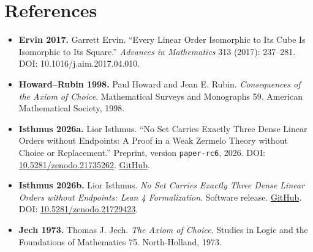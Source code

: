 \documentclass[
  english,
  11pt,
  reqno]{amsart}
\providecommand{\tightlist}{%
  \setlength{\itemsep}{0pt}\setlength{\parskip}{0pt}}
\begin{document}
\section{References}\label{references}

\protect{}\label{ref:ervin2017}

\begin{itemize}
\tightlist
\item
  \textbf{Ervin 2017.} Garrett Ervin. ``Every Linear Order Isomorphic to
  Its Cube Is Isomorphic to Its Square.'' \emph{Advances in Mathematics}
  313 (2017): 237--281. DOI: 10.1016/j.aim.2017.04.010.
\end{itemize}

\protect{}\label{ref:howardrubin1998}

\begin{itemize}
\tightlist
\item
  \textbf{Howard--Rubin 1998.} Paul Howard and Jean E. Rubin.
  \emph{Consequences of the Axiom of Choice}. Mathematical Surveys and
  Monographs 59. American Mathematical Society, 1998.
\end{itemize}

\protect{}\label{ref:isthmus2026a}

\begin{itemize}
\tightlist
\item
  \textbf{Isthmus 2026a.} Lior Isthmus. ``No Set Carries Exactly Three
  Dense Linear Orders without Endpoints: A Proof in a Weak Zermelo
  Theory without Choice or Replacement.'' Preprint, version
  \texttt{paper-rc6}, 2026. DOI:
  \href{https://doi.org/10.5281/zenodo.21735262}{10.5281/zenodo.21735262}.
  \href{https://github.com/lioristhmus/no-exactly-three-dlo}{GitHub}.
\end{itemize}

\protect{}\label{ref:isthmus2026b}

\begin{itemize}
\tightlist
\item
  \textbf{Isthmus 2026b.} Lior Isthmus. \emph{No Set Carries Exactly
  Three Dense Linear Orders without Endpoints: Lean 4 Formalization}.
  Software release.
  \href{https://github.com/lioristhmus/no-exactly-three-dlo-lean}{GitHub}.
  DOI:
  \href{https://doi.org/10.5281/zenodo.21729423}{10.5281/zenodo.21729423}.
\end{itemize}

\protect{}\label{ref:jech1973}

\begin{itemize}
\tightlist
\item
  \textbf{Jech 1973.} Thomas J. Jech. \emph{The Axiom of Choice}.
  Studies in Logic and the Foundations of Mathematics 75. North-Holland,
  1973.
\end{itemize}
\end{document}
